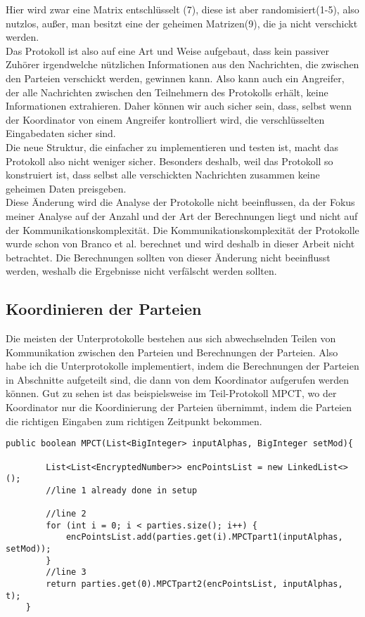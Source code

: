 Hier wird zwar eine Matrix entschlüsselt (7), diese ist aber randomisiert(1-5), also nutzlos, außer, man besitzt eine der geheimen Matrizen(9), die ja nicht verschickt werden.\\
Das Protokoll ist also auf eine Art und Weise aufgebaut, dass kein passiver Zuhörer irgendwelche nützlichen Informationen aus den Nachrichten, die zwischen den Parteien verschickt werden, gewinnen kann. Also kann auch ein Angreifer, der alle Nachrichten zwischen den Teilnehmern des Protokolls erhält, keine Informationen extrahieren. Daher können wir auch sicher sein, dass, selbst wenn der Koordinator von einem Angreifer kontrolliert wird, die verschlüsselten Eingabedaten sicher sind.\\
Die neue Struktur, die einfacher zu implementieren und testen ist, macht das Protokoll also nicht weniger sicher. Besonders deshalb, weil das Protokoll so konstruiert ist, dass selbst alle verschickten Nachrichten zusammen keine geheimen Daten preisgeben.\\
Diese Änderung wird die Analyse der Protokolle nicht beeinflussen, da der Fokus meiner Analyse auf der Anzahl und der Art der Berechnungen liegt und nicht auf der Kommunikationskomplexität. Die Kommunikationskomplexität der Protokolle wurde schon von Branco et al. berechnet und wird deshalb in dieser Arbeit nicht betrachtet. Die Berechnungen sollten von dieser Änderung nicht beeinflusst werden, weshalb die Ergebnisse nicht verfälscht werden sollten.

\subsection{Koordinieren der Parteien}
Die meisten der Unterprotokolle bestehen aus sich abwechselnden Teilen von Kommunikation zwischen den Parteien und Berechnungen der Parteien. Also habe ich die Unterprotokolle implementiert, indem die Berechnungen der Parteien in Abschnitte aufgeteilt sind, die dann von dem Koordinator aufgerufen werden können. Gut zu sehen ist das beispielsweise im Teil-Protokoll MPCT, wo der Koordinator nur die Koordinierung der Parteien übernimmt, indem die Parteien die richtigen Eingaben zum richtigen Zeitpunkt bekommen.\\

\begin{lstlisting}[caption = Ausschnitt der Implementierung von MPCT (vereinfacht)]
public boolean MPCT(List<BigInteger> inputAlphas, BigInteger setMod){

        List<List<EncryptedNumber>> encPointsList = new LinkedList<>();
        //line 1 already done in setup

        //line 2
        for (int i = 0; i < parties.size(); i++) {
            encPointsList.add(parties.get(i).MPCTpart1(inputAlphas, setMod));
        }
        //line 3
        return parties.get(0).MPCTpart2(encPointsList, inputAlphas, t);
    }

\end{lstlisting}

